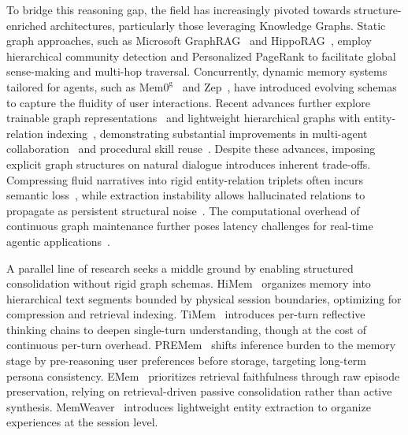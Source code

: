 To bridge this reasoning gap, the field has increasingly pivoted towards structure-enriched architectures, particularly those leveraging Knowledge Graphs. Static graph approaches, such as Microsoft GraphRAG~\cite{edge2024local} and HippoRAG~\cite{gutierrez2025rag}, employ hierarchical community detection and Personalized PageRank to facilitate global sense-making and multi-hop traversal. Concurrently, dynamic memory systems tailored for agents, such as $\text{Mem0}^\text{g}$~\cite{chhikara2025mem0} and Zep~\cite{rasmussen2025zep}, have introduced evolving schemas to capture the fluidity of user interactions. Recent advances further explore trainable graph representations~\cite{xia2025experience} and lightweight hierarchical graphs with entity-relation indexing~\cite{huang2025licomemory}, demonstrating substantial improvements in multi-agent collaboration~\cite{zhang2025g} and procedural skill reuse~\cite{fang2025memp}. Despite these advances, imposing explicit graph structures on natural dialogue introduces inherent trade-offs. Compressing fluid narratives into rigid entity-relation triplets often incurs semantic loss~\cite{chaudhri2022knowledge,zhuang2025linearrag}, while extraction instability allows hallucinated relations to propagate as persistent structural noise~\cite{zhong2021frustratingly,kolluru2020openie6}. The computational overhead of continuous graph maintenance further poses latency challenges for real-time agentic applications~\cite{edge2024local,fang2025lightmem}.

A parallel line of research seeks a middle ground by enabling structured consolidation without rigid graph schemas. HiMem~\cite{zhang2026himem} organizes memory into hierarchical text segments bounded by physical session boundaries, optimizing for compression and retrieval indexing. TiMem~\cite{li2026timem} introduces per-turn reflective thinking chains to deepen single-turn understanding, though at the cost of continuous per-turn overhead. PREMem~\cite{kim2025pre} shifts inference burden to the memory stage by pre-reasoning user preferences before storage, targeting long-term persona consistency. EMem~\cite{zhou2025simple} prioritizes retrieval faithfulness through raw episode preservation, relying on retrieval-driven passive consolidation rather than active synthesis. MemWeaver~\cite{yu2025memweaver} introduces lightweight entity extraction to organize experiences at the session level.